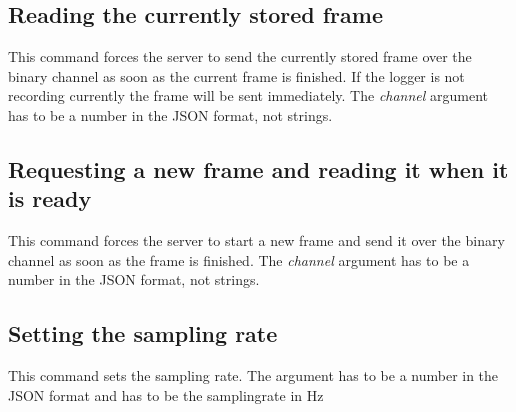 \subsection{Reading the currently stored frame}

This command forces the server to send the currently stored frame over the binary channel as soon as the current frame is finished. If the logger is not recording currently the frame will be sent immediately.
The \textit{channel} argument has to be a number in the JSON format, not strings.


\subsection{Requesting a new frame and reading it when it is ready}
This command forces the server to start a new frame and send it over the binary channel as soon as the frame is finished.
The \textit{channel} argument has to be a number in the JSON format, not strings.


\subsection{Setting the sampling rate}

This command sets the sampling rate.
The argument has to be a number in the JSON format and has to be the samplingrate in \si{\Hz}

